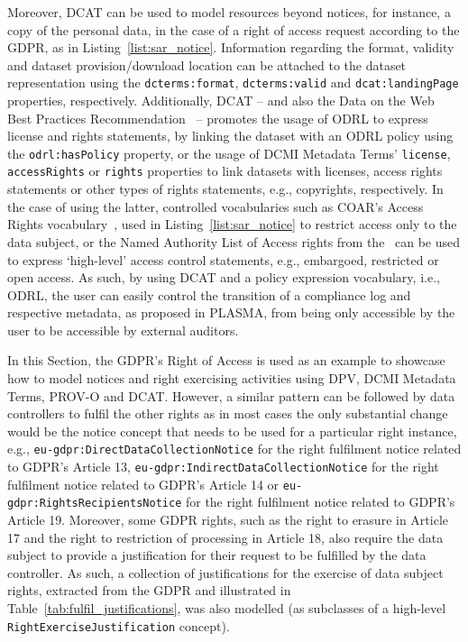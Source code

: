 Moreover, DCAT \citep{albertoni_data_2020} can be used to model resources beyond notices, for instance, a copy of the personal data, in the case of a right of access request according to the GDPR, as in Listing~\ref{list:sar_notice}.
Information regarding the format, validity and dataset provision/download location can be attached to the dataset representation using the \texttt{dcterms:format}, \texttt{dcterms:valid} and \texttt{dcat:landingPage} properties, respectively.
Additionally, DCAT -- and also the Data on the Web Best Practices Recommendation~\citep{loscio_data_2017} -- promotes the usage of ODRL to express license and rights statements, by linking the dataset with an ODRL policy using the \texttt{odrl:hasPolicy} property, or the usage of DCMI Metadata Terms' \texttt{license}, \texttt{accessRights} or \texttt{rights} properties to link datasets with licenses, access rights statements or other types of rights statements, e.g., copyrights, respectively.
In the case of using the latter, controlled vocabularies such as COAR's Access Rights vocabulary~\citep{apollaro_controlled_2022}, used in Listing~\ref{list:sar_notice} to restrict access only to the data subject, or the Named Authority List of Access rights from the~\cite{publications_office_of_the_european_union_named_2023} can be used to express `high-level' access control statements, e.g., embargoed, restricted or open access.
As such, by using DCAT and a policy expression vocabulary, i.e., ODRL, the user can easily control the transition of a compliance log and respective metadata, as proposed in PLASMA, from being only accessible by the user to be accessible by external auditors.

In this Section, the GDPR's Right of Access is used as an example to showcase how to model notices and right exercising activities using DPV, DCMI Metadata Terms, PROV-O and DCAT.
However, a similar pattern can be followed by data controllers to fulfil the other rights as in most cases the only substantial change would be the notice concept that needs to be used for a particular right instance, e.g., \texttt{eu-gdpr:DirectDataCollectionNotice} for the right fulfilment notice related to GDPR's Article 13, \texttt{eu-gdpr:IndirectDataCollectionNotice} for the right fulfilment notice related to GDPR's Article 14 or \texttt{eu-gdpr:RightsRecipientsNotice} for the right fulfilment notice related to GDPR's Article 19.
Moreover, some GDPR rights, such as the right to erasure in Article 17 and the right to restriction of processing in Article 18, also require the data subject to provide a justification for their request to be fulfilled by the data controller.
As such, a collection of justifications for the exercise of data subject rights, extracted from the GDPR and illustrated in Table~\ref{tab:fulfil_justifications}, was also modelled (as subclasses of a high-level \texttt{RightExerciseJustification} concept). %



